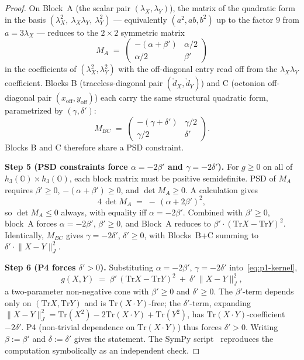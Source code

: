 \documentclass[12pt]{article}
\theoremstyle{remark}
\newcommand{\hthree}{h_3(\mathbb{O})}
\newcommand{\Tr}{\mathrm{Tr}}
\newcommand{\Jnorm}[1]{\lVert #1 \rVert_J}
\begin{document}
\begin{proof}
On Block~A (the scalar pair $(\lambda_X, \lambda_Y)$), the matrix
of the quadratic form in the basis $(\lambda_X^2,\ \lambda_X
\lambda_Y,\ \lambda_Y^2)$ — equivalently $(a^2, ab, b^2)$ up to
the factor $9$ from $a = 3\lambda_X$ — reduces to the $2 \times 2$
symmetric matrix
\[
  M_A \;=\; \begin{pmatrix} -(\alpha + \beta') & \alpha/2 \\ \alpha/2 & \beta' \end{pmatrix}
\]
in the coefficients of $(\lambda_X^2, \lambda_Y^2)$ with the
off-diagonal entry read off from the $\lambda_X \lambda_Y$
coefficient. Blocks B (traceless-diagonal pair
$(\mathring{d}_X, \mathring{d}_Y)$) and C (octonion off-diagonal
pair $(x_{\mathrm{off}}, y_{\mathrm{off}})$) each carry the same
structural quadratic form, parametrized by $(\gamma, \delta')$:
\[
  M_{BC} \;=\; \begin{pmatrix} -(\gamma + \delta') & \gamma/2 \\ \gamma/2 & \delta' \end{pmatrix}.
\]
Blocks B and C therefore share a PSD constraint.

\textbf{Step 5 (PSD constraints force $\alpha = -2\beta'$ and
$\gamma = -2\delta'$).} For $g \geq 0$ on all of
$\hthree \times \hthree$, each block matrix must be positive
semidefinite. PSD of $M_A$ requires $\beta' \geq 0$,
$-(\alpha + \beta') \geq 0$, and $\det M_A \geq 0$. A calculation
gives
\[
  4\,\det M_A \;=\; -\,(\alpha + 2\beta')^2,
\]
so $\det M_A \leq 0$ always, with equality iff
$\alpha = -2\beta'$. Combined with $\beta' \geq 0$, block~A forces
$\alpha = -2\beta'$, $\beta' \geq 0$, and Block~A reduces to
$\beta' \cdot (\Tr X - \Tr Y)^2$. Identically, $M_{BC}$ gives
$\gamma = -2\delta'$, $\delta' \geq 0$, with Blocks~B+C summing
to $\delta' \cdot \Jnorm{X - Y}^2$.

\textbf{Step 6 (P4 forces $\delta' > 0$).} Substituting
$\alpha = -2\beta'$, $\gamma = -2\delta'$ into~\eqref{eq:p1-kernel},
\[
  g(X, Y) \;=\; \beta'\,(\Tr X - \Tr Y)^2 \ +\ \delta'\,\Jnorm{X - Y}^2,
\]
a two-parameter non-negative cone with $\beta' \geq 0$ and
$\delta' \geq 0$. The $\beta'$-term depends only on $(\Tr X, \Tr Y)$
and is $\Tr(X \cdot Y)$-free; the $\delta'$-term, expanding
$\Jnorm{X - Y}^2 = \Tr(X^2) - 2\Tr(X \cdot Y) + \Tr(Y^2)$, has
$\Tr(X \cdot Y)$-coefficient $-2\delta'$. P4 (non-trivial
dependence on $\Tr(X \cdot Y)$) thus forces $\delta' > 0$.
Writing $\beta := \beta'$ and $\delta := \delta'$ gives the
statement. The SymPy script~\cite{phi-uniqueness} reproduces the
computation symbolically as an independent check.
\end{proof}
\end{document}
